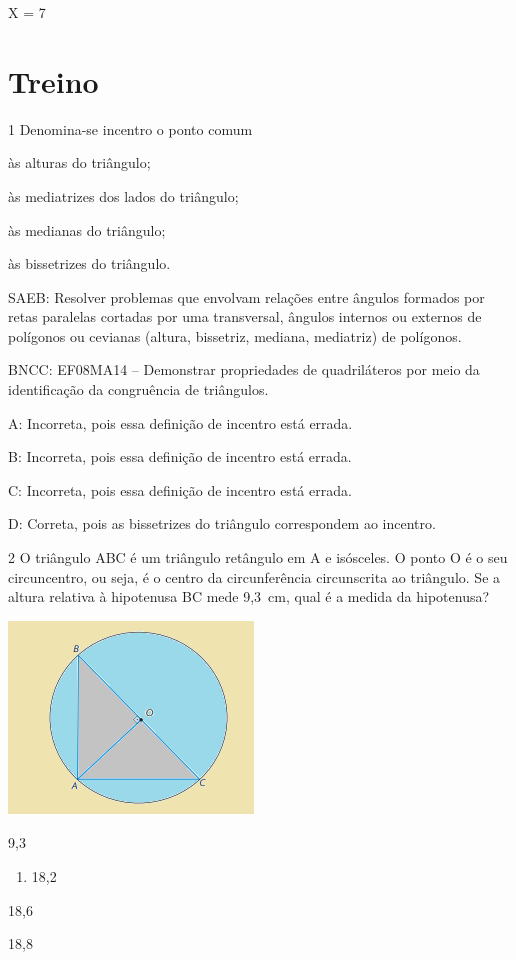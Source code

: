 {X = 7

\section{Treino}

\num{1} Denomina-se incentro o ponto comum
\item às alturas do triângulo;
\item às mediatrizes dos lados do triângulo;
\item às medianas do triângulo;
\item às bissetrizes do triângulo.

SAEB: Resolver problemas que envolvam relações entre ângulos formados
por retas paralelas cortadas por uma transversal, ângulos internos ou
externos de polígonos ou cevianas (altura, bissetriz, mediana,
mediatriz) de polígonos.

BNCC: EF08MA14 -- Demonstrar propriedades de quadriláteros por meio da
identificação da congruência de triângulos.

A: Incorreta, pois essa definição de incentro está errada.

B: Incorreta, pois essa definição de incentro está errada.

C: Incorreta, pois essa definição de incentro está errada.

D: Correta, pois as bissetrizes do triângulo correspondem ao incentro.

\num{2} O triângulo ABC é um triângulo retângulo em A e isósceles. O ponto O
é o seu circuncentro, ou seja, é o centro da circunferência circunscrita
ao triângulo. Se a altura relativa à hipotenusa BC mede 9,3~cm, qual é a
medida da hipotenusa?

\includegraphics[width=2.5625in,height=2.02083in]{./imgSAEB_8_MAT/media/image35.png}
\item 9,3

\begin{enumerate}
\def\labelenumi{\alph{enumi})}
\setcounter{enumi}{1}
\tightlist
\item
  18,2
\end{enumerate}
\item 18,6
\item 18,8

}
